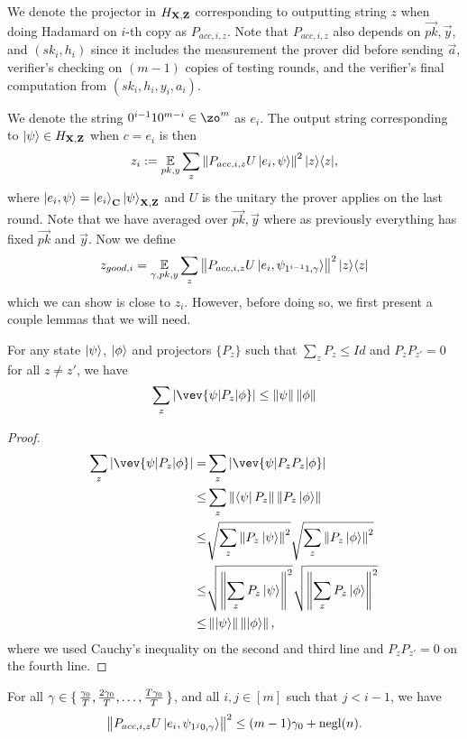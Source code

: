 We denote the projector in $H_{\mathbf{X},\mathbf{Z}}$ corresponding to outputting string $z$ when doing Hadamard on $i$-th copy as $P_{acc,i,z}$.
Note that $P_{acc,i,z}$ also depends on $\vec{pk}, \vec{y}$, and $(sk_i, h_i)$ since it includes the measurement the prover did before sending $\vec{a}$,  verifier's checking on $(m-1)$ copies of testing rounds, and  the verifier's final computation from $(sk_i,h_i,y_i,a_i)$.

We denote the string $0^{i-1}10^{m-i} \in \zo^m$ as $e_i$. The output string corresponding to $\ket{\psi} \in H_{\mathbf{X},\mathbf{Z}}$ when $c=e_i$ is then
$$z_i:= \operatorname*{\mathbb{E}}_{pk,y} \sum_z \left\lVert P_{acc,i,z} U\ket{e_i,\psi}\right\rVert^2|z\rangle\langle z|,$$
where $\ket{e_i,\psi}=\ket{e_i}_{\mathbf{C}}\ket{\psi}_{\mathbf{X},\mathbf{Z}}$ and $U$ is the unitary the prover applies on the last round.
Note that we have averaged over $\vec{pk}, \vec{y}$ where as previously everything has fixed $\vec{pk}$ and $\vec{y}$.
Now we define
\begin{align}
	z_{good, i}=\operatorname*{\mathbb{E}}_{\gamma, pk, y} \sum_z \left\lVert P_{acc,i,z} U\ket{e_i,\psi_{1^{i-1}1,\gamma}}\right\rVert^2|z\rangle\langle z|
\end{align}
which we can show is close to $z_i$.
However, before doing so, we first present a couple lemmas that we will need.
\begin{lemma}\label{lem:samp-tech}
	For any state $\ket{\psi}$,  $\ket{\phi}$ and projectors $\{P_z\}$ such that $\sum_z P_z \leq Id$ and $P_z P_{z'} =0 $ for all $z\neq z'$, we have
	$$  \sum_z |\vev{\psi|P_z|\phi}| \leq \norm{\psi}\norm{\phi} $$
\end{lemma}
\begin{proof}
	\begin{align}
		\sum_z |\vev{\psi|P_z|\phi}| =&\sum_z|\vev{\psi|P_zP_z|\phi}| \nn \\
		\leq& \sum_z \norm{\bra{\psi}P_z} \norm{ P_z\ket{\phi}} \nn \\
		\leq&  \sqrt{\sum_z \norm{P_z\ket{\psi}}^2} \sqrt{\sum_z\norm{P_z\ket{\phi}}^2} \nn \\
		\leq& \sqrt{\norm{\sum_z P_z\ket{\psi}}^2 } \sqrt{\norm{\sum_z P_z\ket{\phi}}^2 } \nn \\
		\leq & \norm{\ket{\psi}}\norm{\ket{\phi}},
	\end{align}
	where we used Cauchy's inequality on the second and third line and $P_z P_{z'} =0 $ on the fourth line.
\end{proof}
\begin{lemma}
	\label{lem:partition-testing}
	For all $\gamma\in\set{\frac{\gamma_0}{T},\frac{2\gamma_0}{T},\dots,\frac{T\gamma_0}{T}}$, and all $i,j\in[m]$ such that $j<i-1$, we have
	$$\left\lVert P_{acc,i,z} U \ket{e_i, \psi_{1^j0,\gamma}}\right\rVert^2\leq (m-1)\gamma_0+\operatorname{negl}(n).$$
\end{lemma}
